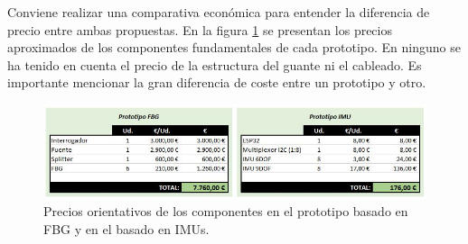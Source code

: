 	
	\clearpage
	
	Conviene realizar una comparativa económica para entender la diferencia de precio entre ambas propuestas. En la figura \ref{fig:precioCompara} se presentan los precios aproximados de los componentes fundamentales de cada prototipo. En ninguno se ha tenido en cuenta el precio de la estructura del guante ni el cableado. Es importante mencionar la gran diferencia de coste entre un prototipo y otro.
	
	\begin{figure}[H]
		\centering
		\includegraphics[width=\textwidth]{./img/precios2}
		\caption{Precios orientativos de los componentes en el prototipo basado en FBG y en el basado en IMUs. } 
		\label{fig:precioCompara}
	\end{figure} 
	
	
	
